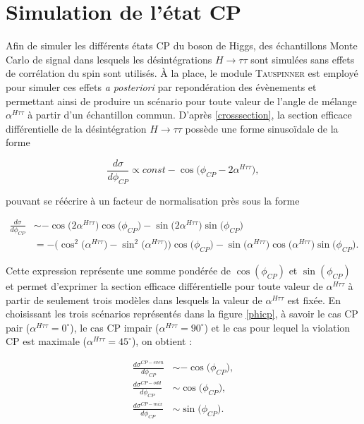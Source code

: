 \section{Simulation de l'état CP}
\label{CPsim}

Afin de simuler les différents états CP du boson de Higgs, des échantillons Monte Carlo de signal dans lesquels les désintégrations $H\rightarrow\tau\tau$ sont simulées sans effets de corrélation du spin sont utilisés. À la place, le module \textsc{Tauspinner} \cite{Czyczula2012,Przedzinski2014} est employé pour simuler ces effets \textit{a posteriori} par repondération des évènements et permettant ainsi de produire un scénario pour toute valeur de l'angle de mélange $\alpha^{H\tau\tau}$ à partir d'un échantillon commun. D'après \ref{crosssection}, la section efficace différentielle de la désintégration $H\rightarrow\tau\tau$ possède une forme sinusoïdale de la forme 

\begin{equation}
    \frac{d\sigma}{d\phi_{CP}}\propto const-\cos\bigl(\phi_{CP}-2\alpha^{H\tau\tau}\bigr),
\end{equation}

pouvant se réécrire à un facteur de normalisation près sous la forme

\begin{align*}
    \frac{d\sigma}{d\phi_{CP}} & \sim-\cos\bigl(2\alpha^{H\tau\tau}\bigr)\cos\bigl(\phi_{CP}\bigr)-\sin\bigl(2\alpha^{H\tau\tau}\bigr)\sin\bigl(\phi_{CP}\bigr) \\
    & = -\bigl(\cos^2\bigl(\alpha^{H\tau\tau}\bigr)-\sin^2\bigl(\alpha^{H\tau\tau}\bigr)\bigr)\cos\bigl(\phi_{CP}\bigr)-\sin\bigl(\alpha^{H\tau\tau}\bigr)\cos\bigl(\alpha^{H\tau\tau}\bigr)\sin\bigl(\phi_{CP}\bigr).
\end{align*}

Cette expression représente une somme pondérée de $\cos(\phi_{CP})$ et $\sin(\phi_{CP})$ et permet d'exprimer la section efficace différentielle pour toute valeur de $\alpha^{H\tau\tau}$ à partir de seulement trois modèles dans lesquels la valeur de $\alpha^{H\tau\tau}$ est fixée. En choisissant les trois scénarios représentés dans la figure \ref{phicp}, à savoir le cas CP pair ($\alpha^{H\tau\tau}=0^\circ$), le cas CP impair ($\alpha^{H\tau\tau}=90^\circ$) et le cas pour lequel la violation CP est maximale ($\alpha^{H\tau\tau}=45^\circ$), on obtient :

\begin{align}
    \frac{d\sigma^{CP-even}}{d\phi_{CP}} & \sim -\cos\bigl(\phi_{CP}\bigr), \\[1em]
    \frac{d\sigma^{CP-odd}}{d\phi_{CP}} & \sim \cos\bigl(\phi_{CP}\bigr), \\[1em]
    \frac{d\sigma^{CP-mix}}{d\phi_{CP}} & \sim \sin\bigl(\phi_{CP}\bigr).   
\end{align}

